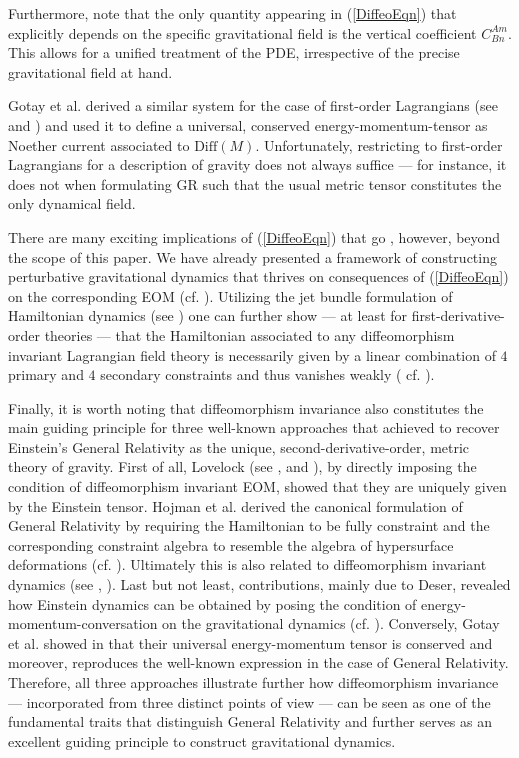 \documentclass[%
 reprint,
nofootinbib,
 amsmath,amssymb,
 aps,
 prd,
floatfix,
]{revtex4-2}
\begin{document}
Furthermore, note that the only quantity appearing in (\ref{DiffeoEqn}) that explicitly depends on the specific gravitational field is the vertical coefficient $C^{Am}_{Bn}$. This allows for a unified treatment of the PDE, irrespective of the precise gravitational field at hand. 

\iffalse
Similar equations were already obtained in the context of variational calculus and gauge symmetries (cf. \cite{article}). 
\fi
Gotay et al. derived a similar system for the case of first-order Lagrangians (see \cite{Gotay1992StressEnergyMomentumTA} and \cite{1998physics...1019G}) and used it to define a universal, conserved energy-momentum-tensor as Noether current associated to $\mathrm{Diff}(M)$. 
Unfortunately, restricting to first-order Lagrangians for a description of gravity does not always suffice --- for instance, it does not when formulating GR such that the usual metric tensor constitutes the only dynamical field.

There are many exciting implications of (\ref{DiffeoEqn}) that go , however, beyond the scope of this paper. We have already presented a framework of constructing perturbative gravitational dynamics that thrives on consequences of (\ref{DiffeoEqn}) on the corresponding EOM (cf. \cite{TobiR}).
Utilizing the jet bundle formulation of Hamiltonian dynamics (see \cite{2004math.ph..11032G}) one can further show --- at least for first-derivative-order theories --- that the Hamiltonian associated to any diffeomorphism invariant Lagrangian field theory is necessarily given by a linear combination of $4$ primary and $4$ secondary constraints and thus vanishes weakly ( cf. \cite{TobiMaster}).

Finally, it is worth noting that diffeomorphism invariance also constitutes the main guiding principle for three well-known approaches that achieved to recover Einstein's General Relativity as the unique, second-derivative-order, metric theory of gravity. 
First of all, Lovelock (see \cite{Lovelock1969}, \cite{doi:10.1063/1.1665613} and \cite{doi:10.1063/1.1666069}), by directly imposing the condition of diffeomorphism invariant EOM, showed that they are uniquely given by the Einstein tensor.
Hojman et al. derived the canonical formulation of General Relativity by requiring the Hamiltonian to be fully constraint and the corresponding constraint algebra to resemble the algebra of hypersurface deformations (cf. \cite{HOJMAN197688}).
Ultimately this is also related to diffeomorphism invariant dynamics (see \cite{TobiMaster}, \cite{bojowald_2010}).
Last but not least, contributions, mainly due to Deser, revealed how Einstein dynamics can be obtained by posing the condition of energy-momentum-conversation on the gravitational dynamics (cf. \cite{1970GReGr...1....9D}).
Conversely, Gotay et al. showed in \cite{Gotay1992StressEnergyMomentumTA} that their universal energy-momentum tensor is conserved and moreover, reproduces the well-known expression in the case of General Relativity.
Therefore, all three approaches illustrate further how diffeomorphism invariance --- incorporated from three distinct points of view --- can be seen as one of the fundamental traits that distinguish General Relativity and further serves as an excellent guiding principle to construct gravitational dynamics.
\end{document}
